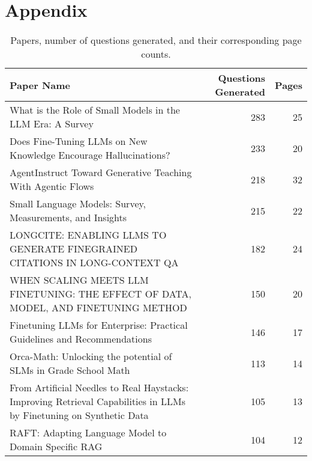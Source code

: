 \clearpage
\appendix
\section{Appendix}

\begin{table}[h]
   \centering
   \caption{Papers, number of questions generated, and their corresponding page counts.}
   \label{tab:questions_and_pages}
   \begin{tabular}{p{8cm} r r}
   \toprule
   \textbf{Paper Name} & \textbf{Questions Generated} & \textbf{Pages} \\
   \midrule
   What is the Role of Small Models in the LLM Era: A Survey & 283 & 25 \\
   Does Fine-Tuning LLMs on New Knowledge Encourage Hallucinations? & 233 & 20 \\
   AgentInstruct Toward Generative Teaching With Agentic Flows & 218 & 32 \\
   Small Language Models: Survey, Measurements, and Insights & 215 & 22 \\
   LONGCITE: ENABLING LLMS TO GENERATE FINEGRAINED CITATIONS IN LONG-CONTEXT QA & 182 & 24 \\
   WHEN SCALING MEETS LLM FINETUNING: THE EFFECT OF DATA, MODEL, AND FINETUNING METHOD & 150 & 20 \\
   Finetuning LLMs for Enterprise: Practical Guidelines and Recommendations & 146 & 17 \\
   Orca-Math: Unlocking the potential of SLMs in Grade School Math & 113 & 14 \\
   From Artificial Needles to Real Haystacks: Improving Retrieval Capabilities in LLMs by Finetuning on Synthetic Data & 105 & 13 \\
   RAFT: Adapting Language Model to Domain Specific RAG & 104 & 12 \\
   \bottomrule
   \end{tabular}
\end{table}

